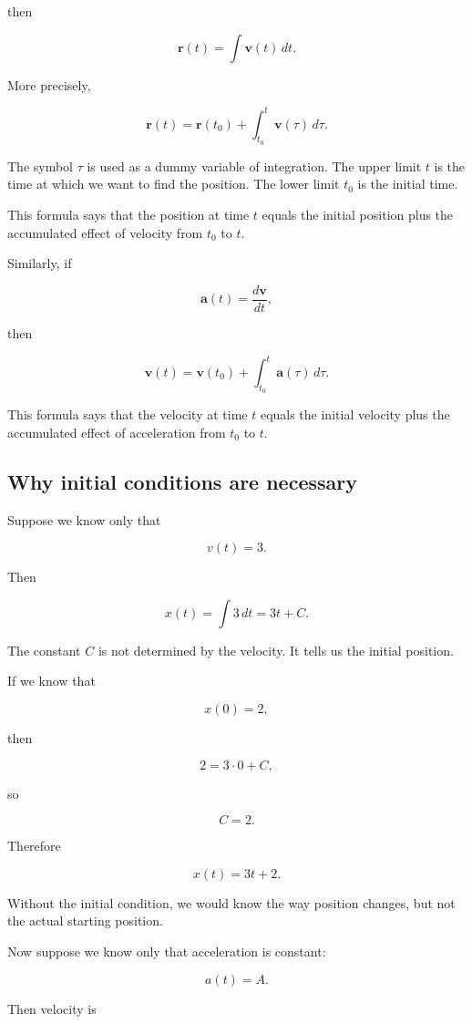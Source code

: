 then

\[
\mathbf{r}(t)
=
\int \mathbf{v}(t)\,dt.
\]

More precisely,

\[
\mathbf{r}(t)
=
\mathbf{r}(t_0)+\int_{t_0}^{t}\mathbf{v}(\tau)\,d\tau.
\]

The symbol \(\tau\) is used as a dummy variable of integration. The upper limit \(t\) is the time at which we want to find the position. The lower limit \(t_0\) is the initial time.

This formula says that the position at time \(t\) equals the initial position plus the accumulated effect of velocity from \(t_0\) to \(t\).

Similarly, if

\[
\mathbf{a}(t)=\frac{d\mathbf{v}}{dt},
\]

then

\[
\mathbf{v}(t)
=
\mathbf{v}(t_0)+\int_{t_0}^{t}\mathbf{a}(\tau)\,d\tau.
\]

This formula says that the velocity at time \(t\) equals the initial velocity plus the accumulated effect of acceleration from \(t_0\) to \(t\).

\subsection{Why initial conditions are necessary}

Suppose we know only that

\[
v(t)=3.
\]

Then

\[
x(t)=\int 3\,dt=3t+C.
\]

The constant \(C\) is not determined by the velocity. It tells us the initial position.

If we know that

\[
x(0)=2,
\]

then

\[
2=3\cdot 0+C,
\]

so

\[
C=2.
\]

Therefore

\[
x(t)=3t+2.
\]

Without the initial condition, we would know the way position changes, but not the actual starting position.

Now suppose we know only that acceleration is constant:

\[
a(t)=A.
\]

Then velocity is

